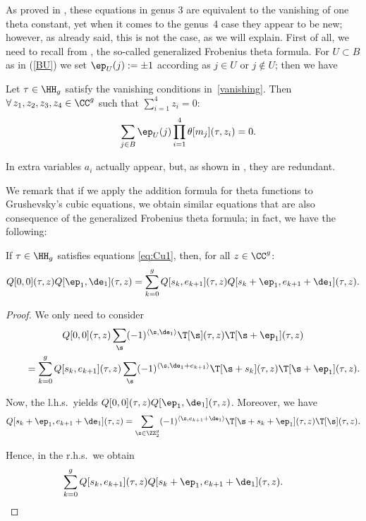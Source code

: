 As proved in \cite{Gr}, these equations in genus 3 are
equivalent to the vanishing of one theta constant, yet when it comes to the genus~4 case they appear to be new; however, as already said, this is not the case, as we will explain. First of all, we need to recall from \cite[Theorem~7.1]{mu}, the so-called generalized Frobenius theta formula. For $U\subset B$ as in (\ref{BU}) we set $\ep_U(j):= \pm1$ according as $j\in U$ or $j\notin U$; then we have

\begin{Theorem} Let $\tau\in\HH_g$ satisfy the vanishing conditions in~\eqref{vanishing}. Then $\forall\, z_1, z_2, z_3, z_4 \in\CC^g$ such that $ \sum\limits_{i=1}^4 z_i=0$:
\begin{gather}\label{eq:FR} \quad \sum_{j\in B} \ep_U(j)\prod_{i=1}^4\theta[m_j](\tau, z_i)=0 . \end{gather}
\end{Theorem}

In \cite{mu} extra variables $a_i$ actually appear, but, as shown in \cite{po}, they are redundant.

We remark that if we apply the addition formula for theta functions to Grushevsky's cubic equations, we obtain similar equations that are also consequence of the generalized Frobenius theta formula; in fact, we have the following:

\begin{Proposition}\label{statement:GF'} If $\tau\in \HH_g$ satisfies equations \eqref{eq:Cu1},
 then, for all $z\in \CC^g$:
\begin{gather}\label{eq:RF2a}
 Q[0, 0] (\tau, z)Q[\ep_1, \de_1 ] (\tau, z)=\sum_{k=0}^g Q[s_k, e_{k+1}] (\tau, z)Q[s_k+\ep_1, e_{k+1}+\de_1] (\tau, z) .
\end{gather}
\end{Proposition}

\begin{proof} We only need to consider
\begin{gather*}
Q[0,0](\tau, z)\sum_{ \s} (-1)^{\langle \s,\de_1\rangle}\T[\s](\tau,z)\T[\s+\ep_1](\tau,z)\\
\qquad{}= \sum_{k=0}^g Q[s_k, e_{k+1}](\tau, z)\sum_{ \s} (-1)^{\langle \s,\de_1+e_{k+1}\rangle}
\T[\s+s_k](\tau,z)\T[\s+\ep_1](\tau,z).
\end{gather*}

Now, the l.h.s.\ yields $ Q[0, 0](\tau, z)Q[\ep_1, \de_1 ] (\tau, z)$. Moreover, we have
\[
Q[s_k+\ep_1, e_{k+1}+\de_1](\tau, z)= \sum_{\s \in\ZZ_2^g} (-1)^{\langle\s, e_{k+1} +\de_1\rangle} \T[\s+s_k+\ep_1](\tau,z)\T[\s](\tau,z).
\]

Hence, in the r.h.s.\ we obtain
\[
\sum_{k=0}^g Q[s_k, e_{k+1}] (\tau, z)Q[s_k+\ep_1, e_{k+1}+\de_1] (\tau, z).\tag*{\qed}
\]\renewcommand{\qed}{}
\end{proof}

